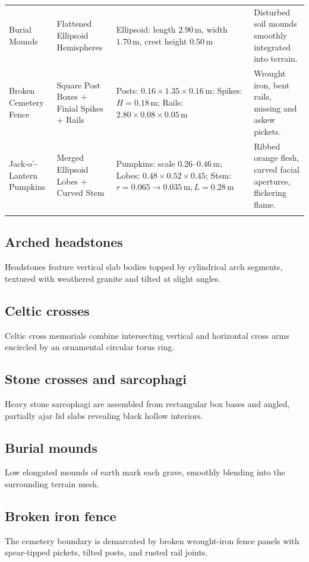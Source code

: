 \documentclass[10pt,a4paper,oneside]{article}
\begin{document}
\begin{longtable}{>{\raggedright\arraybackslash}p{}>{\raggedright\arraybackslash}p{}>{\raggedright\arraybackslash}p{}>{\raggedright\arraybackslash}p{}}
Burial Mounds & Flattened Ellipsoid Hemispheres & Ellipsoid: length $2.90\,\mathrm{m}$, width $1.70\,\mathrm{m}$, crest height $0.50\,\mathrm{m}$ & Disturbed soil mounds smoothly integrated into terrain.\\\addlinespace[3pt]

Broken Cemetery Fence & Square Post Boxes + Finial Spikes + Rails & Posts: $0.16\times 1.35\times 0.16\,\mathrm{m}$; Spikes: $H=0.18\,\mathrm{m}$; Rails: $2.80\times 0.08\times 0.05\,\mathrm{m}$ & Wrought iron, bent rails, missing and askew pickets.\\\addlinespace[3pt]

Jack-o'-Lantern Pumpkins & 10 Merged Ellipsoid Lobes + Curved Stem & 21 Pumpkins: scale $0.26\text{--}0.46\,\mathrm{m}$; Lobes: $0.48\times 0.52\times 0.45$; Stem: $r=0.065\to 0.035\,\mathrm{m}, L=0.28\,\mathrm{m}$ & Ribbed orange flesh, carved facial apertures, flickering flame.\\\addlinespace[3pt]

\bottomrule\end{longtable}

\subsection{Arched headstones}
Headstones feature vertical slab bodies topped by cylindrical arch segments, textured with weathered granite and tilted at slight angles.

\subsection{Celtic crosses}
Celtic cross memorials combine intersecting vertical and horizontal cross arms encircled by an ornamental circular torus ring.

\subsection{Stone crosses and sarcophagi}
Heavy stone sarcophagi are assembled from rectangular box bases and angled, partially ajar lid slabs revealing black hollow interiors.

\subsection{Burial mounds}
Low elongated mounds of earth mark each grave, smoothly blending into the surrounding terrain mesh.

\subsection{Broken iron fence}
The cemetery boundary is demarcated by broken wrought-iron fence panels with spear-tipped pickets, tilted posts, and rusted rail joints.
\end{document}
